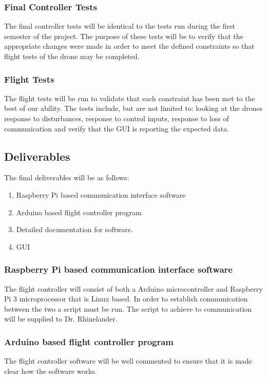 \subsubsection{Final Controller Tests}
The final controller tests will be identical to the tests run during the first semester of the project. The purpose of these tests will be to verify that the appropriate changes were made in order to meet the defined constraints so that flight tests of the drone may be completed. 

\subsubsection{Flight Tests}
The flight tests will be run to validate that each constraint has been met to the best of our ability. The tests include, but are not limited to: looking at the drones response to disturbances, response to control inputs, response to loss of communication and verify that the GUI is reporting the expected data. 

\subsection{Deliverables}
The final deliverables will be as follows: 
\begin{enumerate}
	
 \item Raspberry Pi based communication interface software
\item Arduino based flight controller program
\item Detailed documentation for software.
\item GUI

\end{enumerate}
\subsubsection{Raspberry Pi based communication interface software}
The flight controller will consist of both a Arduino microcontroller and Raspberry Pi 3 microprocessor that is Linux based. In order to establish communication between the two a script must be run. The script to achieve to communication will be supplied to Dr. Rhinelander. 
\subsubsection{Arduino based flight controller program}
The flight controller software will be well commented to ensure that it is made clear how the software works. 
